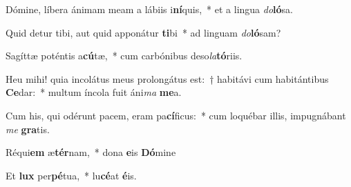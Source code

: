 ﻿\item Dómine, líbera ánimam meam a lábiis i\textbf{ní}quis,~* et a lingua \textit{do}\textbf{ló}sa.

\item Quid detur tibi, aut quid apponátur \textbf{ti}bi~* ad linguam \textit{do}\textbf{ló}sam?

\item Sagíttæ poténtis a\textbf{cú}tæ,~* cum carbónibus deso\textit{la}\textbf{tó}riis.

\item Heu mihi! quia incolátus meus prolongátus est:~† habitávi cum habitántibus \textbf{Ce}dar:~* multum íncola fuit áni\textit{ma} \textbf{me}a.

\item Cum his, qui odérunt pacem, eram pa\textbf{cí}ficus:~* cum loquébar illis, impugnábant \textit{me} \textbf{gra}tis.

\item Réqui\textbf{em} æ\textbf{tér}nam,~* dona \textbf{e}is \textbf{Dó}mine

\item Et \textbf{lux} per\textbf{pé}tua,~* lu\textbf{cé}at \textbf{é}is.
